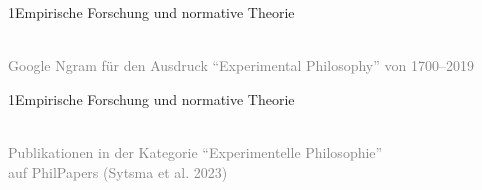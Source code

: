 \documentclass[xcolor=table,9pt,aspectratio=169]{beamer}
\begin{document}
\begin{frame}{\vspace*{10mm}1\hspace*{1em}Empirische Forschung und normative Theorie}
\begin{center}
   \\
   \textcolor{gray}{Google Ngram für den Ausdruck \enquote{Experimental Philosophy} von 1700--2019}
\end{center}
\end{frame}


\begin{frame}{\vspace*{10mm}1\hspace*{1em}Empirische Forschung und normative Theorie}
\begin{center}
   \\
   \textcolor{gray}{Publikationen in der Kategorie \enquote{Experimentelle Philosophie}\\auf PhilPapers (Sytsma et al. 2023)}
\end{center}
\end{frame}
\end{document}
